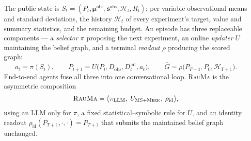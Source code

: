 \documentclass{article}
\newcommand{\rauma}{\textsc{RauMa}}
\newcommand{\meek}{\textsc{Meek}}
\newcommand{\Dobs}{D_{\mathrm{obs}}}
\newcommand{\Dint}[1]{D^{\mathrm{int}}_{#1}}
\begin{document}
The public state is $S_t = (P_t, \boldsymbol{\mu}^{\mathrm{obs}},
\boldsymbol{s}^{\mathrm{obs}}, \mathcal{H}_t, R_t)$: per-variable observational means and
standard deviations, the history $\mathcal{H}_t$ of every experiment's target, value and
summary statistics, and the remaining budget. An episode has three replaceable components ---
a \emph{selector} $\pi$ proposing the next experiment, an online \emph{updater} $U$
maintaining the belief graph, and a terminal \emph{readout} $\rho$ producing the scored
graph:
\begin{equation}
a_t = \pi(S_t), \qquad
P_{t+1} = U\bigl(P_t, \Dobs, \Dint{t}, a_t\bigr), \qquad
\widehat{G} = \rho\bigl(P_{T+1}, P_0, \mathcal{H}_{T+1}\bigr).
\label{eq:factorization}
\end{equation}
End-to-end agents fuse all three into one conversational loop. \rauma{} is the asymmetric
composition
\begin{equation}
\rauma = \bigl(\pi_{\mathrm{LLM}},\; U_{\mathrm{MS}+\meek},\; \rho_{\mathrm{id}}\bigr),
\end{equation}
using an LLM only for $\pi$, a fixed statistical--symbolic rule for $U$, and an identity
readout $\rho_{\mathrm{id}}(P_{T+1},\cdot,\cdot)=P_{T+1}$ that submits the maintained belief
graph unchanged.
\end{document}
